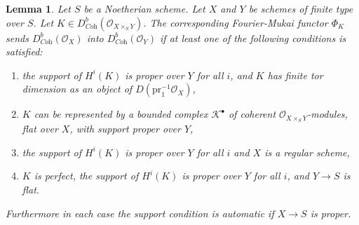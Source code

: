 \documentclass{stacks-project}
\theoremstyle{plain}
\newtheorem{lemma}[subsection]{Lemma}
\theoremstyle{definition}
\theoremstyle{remark}
\numberwithin{equation}{subsection}
\begin{document}
\begin{lemma}
\label{lemma-fourier-mukai-Coh}
Let $S$ be a Noetherian scheme. Let $X$ and $Y$ be schemes of finite type
over $S$. Let $K \in D^b_{\textit{Coh}}(\mathcal{O}_{X \times_S Y})$.
The corresponding Fourier-Mukai functor $\Phi_K$ sends
$D^b_{\textit{Coh}}(\mathcal{O}_X)$ into $D^b_{\textit{Coh}}(\mathcal{O}_Y)$
if at least one of the following conditions is satisfied:
\begin{enumerate}
\item the support of $H^i(K)$ is proper over $Y$ for all $i$, and $K$
has finite tor dimension as an object of $D(\text{pr}_1^{-1}\mathcal{O}_X)$,
\item $K$ can be represented by a bounded complex $\mathcal{K}^\bullet$
of coherent $\mathcal{O}_{X \times_S Y}$-modules, flat over $X$, with support
proper over $Y$,
\item the support of $H^i(K)$ is proper over $Y$ for all $i$
and $X$ is a regular scheme,
\item $K$ is perfect, the support of $H^i(K)$ is proper over $Y$ for all $i$,
and $Y \to S$ is flat.
\end{enumerate}
Furthermore in each case the support condition is automatic
if $X \to S$ is proper.
\end{lemma}
\end{document}
